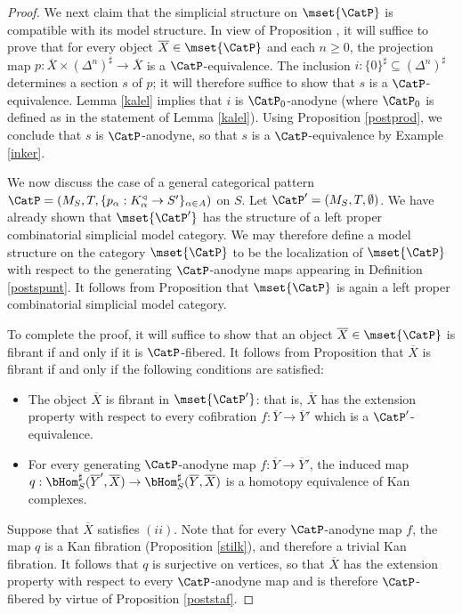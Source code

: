 \begin{proof}
We next claim that the simplicial structure on $\mset{ \CatP}$ is compatible with its model structure.
In view of Proposition , it will suffice to prove that for every object
$\overline{X} \in \mset{ \CatP}$ and each $n \geq 0$, the projection map
$p: \overline{X} \times ( \Delta^n)^{\sharp} \rightarrow \overline{X}$ is a $\CatP$-equivalence.
The inclusion $i: \{0\}^{\sharp} \subseteq (\Delta^n)^{\sharp}$ determines a section $s$ of
$p$; it will therefore suffice to show that $s$ is a $\CatP$-equivalence. Lemma \ref{kalel} implies
that $i$ is $\CatP_0$-anodyne (where $\CatP_0$ is defined as in the statement of Lemma \ref{kalel}).
Using Proposition \ref{postprod}, we conclude that $s$ is $\CatP$-anodyne, so that 
$s$ is a $\CatP$-equivalence by Example \ref{inker}.

We now discuss the case of a general categorical pattern
$\CatP = (M_S, T, \{ p_{\alpha}: K_{\alpha}^{\triangleleft} \rightarrow S' \}_{\alpha \in A})$ on $S$.
Let $\CatP' = (M_S, T, \emptyset)$. We have already shown that $\mset{\CatP'}$ has the structure of a left proper combinatorial simplicial model category. We may therefore define a model structure on the category $\mset{ \CatP}$ to be the localization of $\mset{ \CatP}$ with respect to the generating $\CatP$-anodyne maps appearing in Definition \ref{postspunt}. It follows from Proposition  that
$\mset{ \CatP}$ is again a left proper combinatorial simplicial model category.

To complete the proof, it will suffice to show that an object $\overline{X} \in \mset{ \CatP}$ is 
fibrant if and only if it is $\CatP$-fibered. It follows from Proposition  that
$\overline{X}$ is fibrant if and only if the following conditions are satisfied:
\begin{itemize}
\item[$(i)$] The object $\overline{X}$ is fibrant in $\mset{ \CatP'}$: that is, 
$\overline{X}$ has the extension property with respect to every cofibration
$f: \overline{Y} \rightarrow \overline{Y}'$ which is a $\CatP'$-equivalence.
\item[$(ii)$] For every generating $\CatP$-anodyne map $f: \overline{Y} \rightarrow \overline{Y}'$,
the induced map $q: \bHom_{S}^{\sharp}( \overline{Y}', \overline{X} )
\rightarrow \bHom_{S}^{\sharp}( \overline{Y}, \overline{X} )$ is a homotopy equivalence of Kan complexes.
\end{itemize}
Suppose that $\overline{X}$ satisfies $(ii)$. Note that for every $\CatP$-anodyne map $f$,
the map $q$ is a Kan fibration (Proposition \ref{stilk}), and therefore a trivial Kan fibration.
It follows that $q$ is surjective on vertices, so that $\overline{X}$ has the extension property
with respect to every $\CatP$-anodyne map and is therefore $\CatP$-fibered by
virtue of Proposition \ref{poststaf}.


\end{proof}
